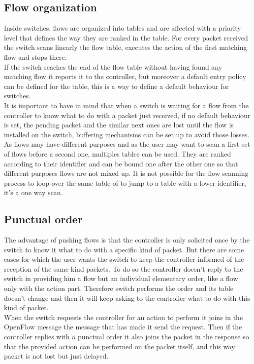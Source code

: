 \documentclass{article}
\begin{document}
\subsection{Flow organization}
Inside switches, flows are organized into tables and are affected with
a priority level that defines the way they are ranked in the
table. For every packet received the switch scans linearly the flow
table, executes the action of the first matching flow and stops there.\\
\newline
If the switch reaches the end of the flow table without having found
any matching flow it reports it to the controller, but moreover a
default entry policy can be defined for the table, this is a way to
define a default behaviour for switches.\\
\newline
It is important to have in mind that when a switch is waiting for a
flow from the controller to know what to do with a packet just
received, if no default behaviour is set, the pending packet and the
similar next ones are lost until the flow is installed on the switch,
buffering mechanisms can be set up to avoid those losses.\\
\newline
As flows may have different purposes and as the user may want to scan a
first set of flows before a second one, multiples tables can be
used. They are ranked according to their identifier and can be bound
one after the other one so that different purposes flows are not mixed
up. It is not possible for the flow scanning process to loop over the
same table of to jump to a table with a lower identifier, it's a one
way scan.

\subsection{Punctual order}

The advantage of pushing flows is that the controller is only
solicited once by the switch to know it what to do with a specific
kind of packet. But there are some cases for which the user wants the
switch to keep the controller informed of the reception of the
same kind packets. To do so the controller doesn't reply to the switch
in providing him a flow but an individual elementary order, like a
flow only with the action part. Therefore switch performs the order and its
table doesn't change and then it will keep asking to the controller
what to do with this kind of packet.\\
\newline
When the switch requests the controller for an action to perform it
joins in the OpenFlow message the message that has made it send the
request. Then if the controller replies with a punctual order it also
joins the packet in the response so that the provided action can be
performed on the packet itself, and this way packet is not lost but
just delayed.
\end{document}
